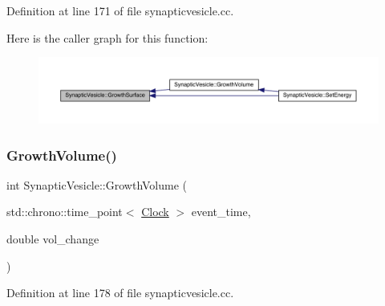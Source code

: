 Definition at line 171 of file synapticvesicle.\+cc.

Here is the caller graph for this function\+:
\nopagebreak
\begin{figure}[H]
\begin{center}
\leavevmode
\includegraphics[width=350pt]{class_synaptic_vesicle_a045f27b28b8b11edc884568b390c22fe_icgraph}
\end{center}
\end{figure}
\mbox{\label{class_synaptic_vesicle_a0d4a4a03405593b3abc0e734c1758830}} 
\subsubsection{\texorpdfstring{Growth\+Volume()}{GrowthVolume()}}
{\footnotesize\ttfamily int Synaptic\+Vesicle\+::\+Growth\+Volume (\begin{DoxyParamCaption}\item[{std\+::chrono\+::time\+\_\+point$<$ \hyperlink{universe_8h_a0ef8d951d1ca5ab3cfaf7ab4c7a6fd80}{Clock} $>$}]{event\+\_\+time,  }\item[{double}]{vol\+\_\+change }\end{DoxyParamCaption})}



Definition at line 178 of file synapticvesicle.\+cc.

